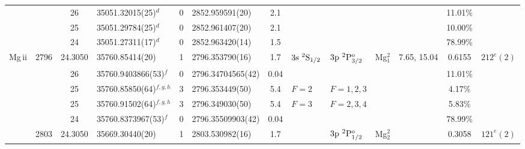 \begin{table*}
\begin{center}
{\begin{tabular}{:l;l;c;l;c;l;c;l;l;c;c;c;c}
\rowstyle{\itshape}               &        & 26        & 35051.32015(25)$^{d}$            & 0 &   2852.959591(20)  &  2.1 & $                                        $ & $                                        $ &             &              & 11.01\%   & $     ^{}     $\\
\rowstyle{\itshape}               &        & 25        & 35051.29784(25)$^{d}$            & 0 &   2852.961407(20)  &  2.1 & $                                        $ & $                                        $ &             &              & 10.00\%   & $     ^{}     $\\
\rowstyle{\itshape}               &        & 24        & 35051.27311(17)$^{d}$            & 0 &   2852.963420(14)  &  1.5 & $                                        $ & $                                        $ &             &              & 78.99\%   & $     ^{}     $\\
                    Mg{\sc \,ii}  & 2796   & 24.3050   & 35760.85414(20)$^{}$             & 1 &   2796.353790(16)  &  1.7 & $3\rm{s}~^2\rm{S}_{1/2}                  $ & $3\rm{p}~^2\rm{P}_{3/2}^{\rm o}          $ & Mg$^2_{1}$  & 7.65, 15.04  & 0.6155    & $  212^{e}(2)  $\\
\rowstyle{\itshape}               &        & 26        & 35760.9403866(53)$^{f}$          & 0 & 2796.34704565(42)  & 0.04 & $                                        $ & $                                        $ &             &              & 11.01\%   & $     ^{}     $\\
\rowstyle{\itshape}               &        & 25        & 35760.85850(64)$^{f,g,h}$        & 3 &   2796.353449(50)  &  5.4 & $F=2                                     $ & $F=1,2,3                                 $ &             &              & 4.17\%    & $     ^{}     $\\
\rowstyle{\itshape}               &        & 25        & 35760.91502(64)$^{f,g,h}$        & 3 &   2796.349030(50)  &  5.4 & $F=3                                     $ & $F=2,3,4                                 $ &             &              & 5.83\%    & $     ^{}     $\\
\rowstyle{\itshape}               &        & 24        & 35760.8373967(53)$^{f}$          & 0 & 2796.35509903(42)  & 0.04 & $                                        $ & $                                        $ &             &              & 78.99\%   & $     ^{}     $\\
                                  & 2803   & 24.3050   & 35669.30440(20)$^{}$             & 1 &   2803.530982(16)  &  1.7 & $                                        $ & $3\rm{p}~^2\rm{P}_{1/2}^{\rm o}          $ & Mg$^2_{2}$  &              & 0.3058    & $  121^{e}(2)  $\\

\end{tabular}}
\end{center}
\end{table*}
